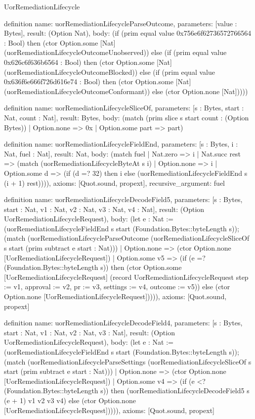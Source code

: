 \begin{lexlean}{UorRemediationLifecycle}
\begin{semanticmodule}
definition{
  name: uorRemediationLifecycleParseOutcome,
  parameters: [value : Bytes],
  result: (Option Nat),
  body: (if (prim equal value 0x756e6f62736572766564 : Bool) then (ctor Option.some [Nat] (uorRemediationLifecycleOutcomeUnobserved)) else (if (prim equal value 0x626c6f636b6564 : Bool) then (ctor Option.some [Nat] (uorRemediationLifecycleOutcomeBlocked)) else (if (prim equal value 0x636f6e666f726d616e74 : Bool) then (ctor Option.some [Nat] (uorRemediationLifecycleOutcomeConformant)) else (ctor Option.none [Nat]))))
}

definition{
  name: uorRemediationLifecycleSliceOf,
  parameters: [s : Bytes, start : Nat, count : Nat],
  result: Bytes,
  body: (match (prim slice s start count : (Option Bytes))
    | Option.none => 0x
    | Option.some part => part)
}

definition{
  name: uorRemediationLifecycleFieldEnd,
  parameters: [s : Bytes, i : Nat, fuel : Nat],
  result: Nat,
  body: (match fuel
    | Nat.zero => i
    | Nat.succ rest => (match (uorRemediationLifecycleByteAt s i)
      | Option.none => i
      | Option.some d => (if (d =? 32) then i else (uorRemediationLifecycleFieldEnd s (i + 1) rest)))),
  axioms: [Quot.sound, propext],
  recursive_argument: fuel
}

definition{
  name: uorRemediationLifecycleDecodeField5,
  parameters: [s : Bytes, start : Nat, v1 : Nat, v2 : Nat, v3 : Nat, v4 : Nat],
  result: (Option UorRemediationLifecycleRequest),
  body: (let e : Nat := (uorRemediationLifecycleFieldEnd s start (Foundation.Bytes::byteLength s)); (match (uorRemediationLifecycleParseOutcome (uorRemediationLifecycleSliceOf s start (prim subtract e start : Nat)))
    | Option.none => (ctor Option.none [UorRemediationLifecycleRequest])
    | Option.some v5 => (if (e =? (Foundation.Bytes::byteLength s)) then (ctor Option.some [UorRemediationLifecycleRequest] (record UorRemediationLifecycleRequest {step := v1, approval := v2, pr := v3, settings := v4, outcome := v5})) else (ctor Option.none [UorRemediationLifecycleRequest])))),
  axioms: [Quot.sound, propext]
}

definition{
  name: uorRemediationLifecycleDecodeField4,
  parameters: [s : Bytes, start : Nat, v1 : Nat, v2 : Nat, v3 : Nat],
  result: (Option UorRemediationLifecycleRequest),
  body: (let e : Nat := (uorRemediationLifecycleFieldEnd s start (Foundation.Bytes::byteLength s)); (match (uorRemediationLifecycleParseSettings (uorRemediationLifecycleSliceOf s start (prim subtract e start : Nat)))
    | Option.none => (ctor Option.none [UorRemediationLifecycleRequest])
    | Option.some v4 => (if (e <? (Foundation.Bytes::byteLength s)) then (uorRemediationLifecycleDecodeField5 s (e + 1) v1 v2 v3 v4) else (ctor Option.none [UorRemediationLifecycleRequest])))),
  axioms: [Quot.sound, propext]
}


\end{semanticmodule}
\end{lexlean}

